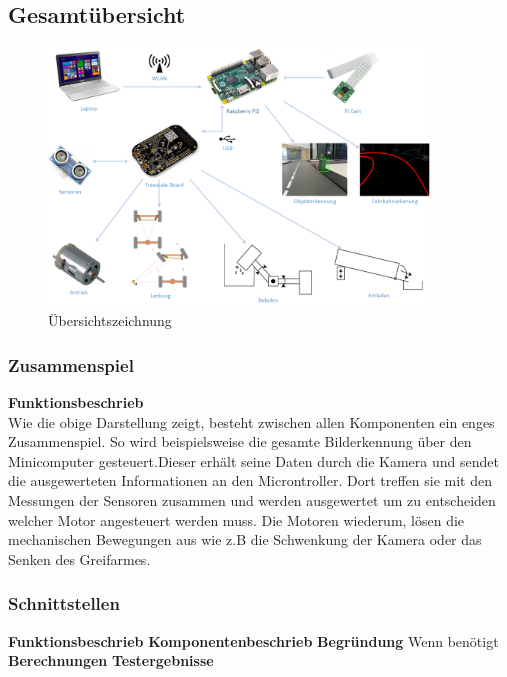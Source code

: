 \subsection{Gesamtübersicht}

\begin{figure}[h!]%
\centering
\includegraphics[width=0.9\textwidth]{03_Loesungskonzept/pictures/uebersichtszeichnung.png}
\caption{Übersichtszeichnung}
\label{fig:Java}
\end{figure}

\subsubsection{Zusammenspiel}
\textbf{Funktionsbeschrieb}\\[0.2cm]
Wie die obige Darstellung zeigt, besteht zwischen allen Komponenten ein enges Zusammenspiel.
So wird beispielsweise die gesamte Bilderkennung über den Minicomputer gesteuert.Dieser erhält seine Daten durch die Kamera und sendet die ausgewerteten Informationen an den Microntroller. Dort treffen sie mit den Messungen der Sensoren zusammen und werden ausgewertet um zu entscheiden welcher Motor angesteuert werden muss. Die Motoren wiederum, lösen die mechanischen Bewegungen aus wie z.B die Schwenkung der Kamera oder das Senken des Greifarmes.
\subsubsection{Schnittstellen}
\textbf{Funktionsbeschrieb}
\textbf{Komponentenbeschrieb}
\textbf{Begründung}
Wenn benötigt
\textbf{Berechnungen}
\textbf{Testergebnisse}